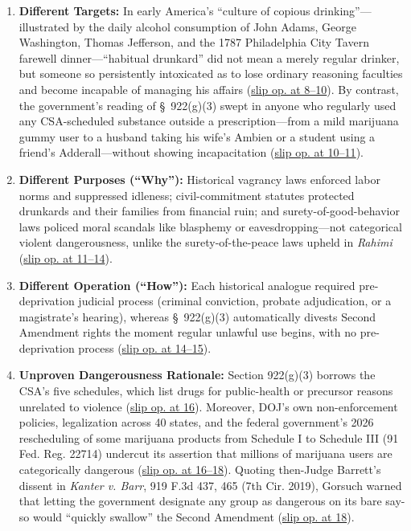 \documentclass[12pt]{article}
\begin{document}
\begin{enumerate}
\item \textbf{Different Targets:} In early America's ``culture of copious drinking''---illustrated by the daily alcohol consumption of John Adams, George Washington, Thomas Jefferson, and the 1787 Philadelphia City Tavern farewell dinner---``habitual drunkard'' did not mean a merely regular drinker, but someone so persistently intoxicated as to lose ordinary reasoning faculties and become incapable of managing his affairs (\href{https://supreme.justia.com/cases/federal/us/608/24-1234/}{slip op. at 8--10}). By contrast, the government's reading of \S~922(g)(3) swept in anyone who regularly used any CSA-scheduled substance outside a prescription---from a mild marijuana gummy user to a husband taking his wife's Ambien or a student using a friend's Adderall---without showing incapacitation (\href{https://supreme.justia.com/cases/federal/us/608/24-1234/}{slip op. at 10--11}).
\item \textbf{Different Purposes (``Why''):} Historical vagrancy laws enforced labor norms and suppressed idleness; civil-commitment statutes protected drunkards and their families from financial ruin; and surety-of-good-behavior laws policed moral scandals like blasphemy or eavesdropping---not categorical violent dangerousness, unlike the surety-of-the-peace laws upheld in \textit{Rahimi} (\href{https://supreme.justia.com/cases/federal/us/608/24-1234/}{slip op. at 11--14}).
\item \textbf{Different Operation (``How''):} Each historical analogue required pre-deprivation judicial process (criminal conviction, probate adjudication, or a magistrate's hearing), whereas \S~922(g)(3) automatically divests Second Amendment rights the moment regular unlawful use begins, with no pre-deprivation process (\href{https://supreme.justia.com/cases/federal/us/608/24-1234/}{slip op. at 14--15}).
\item \textbf{Unproven Dangerousness Rationale:} Section 922(g)(3) borrows the CSA's five schedules, which list drugs for public-health or precursor reasons unrelated to violence (\href{https://supreme.justia.com/cases/federal/us/608/24-1234/}{slip op. at 16}). Moreover, DOJ's own non-enforcement policies, legalization across 40 states, and the federal government's 2026 rescheduling of some marijuana products from Schedule I to Schedule III (91 Fed. Reg. 22714) undercut its assertion that millions of marijuana users are categorically dangerous (\href{https://supreme.justia.com/cases/federal/us/608/24-1234/}{slip op. at 16--18}). Quoting then-Judge Barrett's dissent in \textit{Kanter v. Barr}, 919 F.3d 437, 465 (7th Cir. 2019), Gorsuch warned that letting the government designate any group as dangerous on its bare say-so would ``quickly swallow'' the Second Amendment (\href{https://supreme.justia.com/cases/federal/us/608/24-1234/}{slip op. at 18}).
\end{enumerate}
\end{document}
